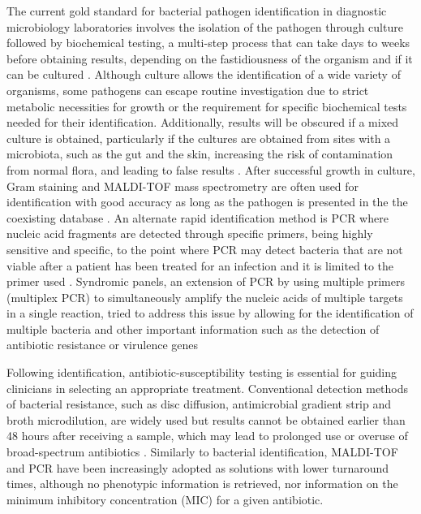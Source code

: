 The current gold standard for bacterial pathogen identification in diagnostic microbiology laboratories involves the isolation of the pathogen through culture followed by biochemical testing, a multi-step process that can take days to weeks before obtaining results, depending on the fastidiousness of the organism and if it can be cultured \citep{muhamad_rizal_advantages_2020, giuliano_guide_2019, muhamad_rizal_advantages_2020}. 
Although culture allows the identification of a wide variety of organisms, some pathogens can escape routine investigation due to strict metabolic necessities for growth or the requirement for specific biochemical tests needed for their identification. 
Additionally, results will be obscured if a mixed culture is obtained, particularly if the cultures are obtained from sites with a microbiota, such as the gut and the skin, increasing the risk of contamination from normal flora, and leading to false results \citep{giuliano_guide_2019}. 
After successful growth in culture, Gram staining and MALDI-TOF mass spectrometry are often used for identification with good accuracy as long as the pathogen is presented in the the coexisting database \citep{patel_maldi-tof_2015}. 
An alternate rapid identification method is PCR where nucleic acid fragments are detected through specific primers, being highly sensitive and specific, to the point where PCR may detect bacteria that are not viable after a patient has been treated for an infection and it is limited to the primer used \citep{scerbo_beyond_2016}. 
Syndromic panels, an extension of PCR by using multiple primers (multiplex PCR) to simultaneously amplify the nucleic acids of multiple targets in a single reaction, tried to address this issue by allowing for the identification of multiple bacteria and other important information such as the detection of antibiotic resistance or virulence genes \citep{giuliano_guide_2019}

Following identification, antibiotic-susceptibility testing is essential for guiding clinicians in selecting an appropriate treatment. 
Conventional detection methods of bacterial resistance, such as disc diffusion, antimicrobial gradient strip and broth microdilution, are widely used but results cannot be obtained earlier than 48 hours after receiving a sample, which may lead to prolonged use or overuse of broad-spectrum antibiotics \citep{benkova_antimicrobial_2020}. 
Similarly to bacterial identification, MALDI-TOF and PCR have been increasingly adopted as solutions with lower turnaround times, although no phenotypic information is retrieved, nor information on the minimum inhibitory concentration (MIC) for a given antibiotic.   

